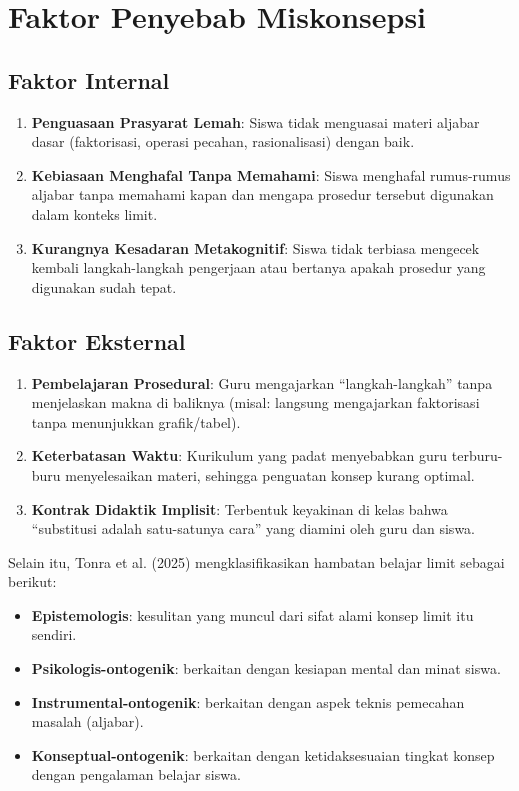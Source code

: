 \documentclass[12pt,a4paper,openany]{book}
\theoremstyle{definition}
\begin{document}
\chapter{Faktor Penyebab Miskonsepsi}

\section{Faktor Internal}

\begin{enumerate}
  \item \textbf{Penguasaan Prasyarat Lemah}: Siswa tidak menguasai materi aljabar dasar (faktorisasi, operasi pecahan, rasionalisasi) dengan baik.
  \item \textbf{Kebiasaan Menghafal Tanpa Memahami}: Siswa menghafal rumus-rumus aljabar tanpa memahami kapan dan mengapa prosedur tersebut digunakan dalam konteks limit.
  \item \textbf{Kurangnya Kesadaran Metakognitif}: Siswa tidak terbiasa mengecek kembali langkah-langkah pengerjaan atau bertanya apakah prosedur yang digunakan sudah tepat.
\end{enumerate}

\section{Faktor Eksternal}

\begin{enumerate}
  \item \textbf{Pembelajaran Prosedural}: Guru mengajarkan ``langkah-langkah'' tanpa menjelaskan makna di baliknya (misal: langsung mengajarkan faktorisasi tanpa menunjukkan grafik/tabel).
  \item \textbf{Keterbatasan Waktu}: Kurikulum yang padat menyebabkan guru terburu-buru menyelesaikan materi, sehingga penguatan konsep kurang optimal.
  \item \textbf{Kontrak Didaktik Implisit}: Terbentuk keyakinan di kelas bahwa ``substitusi adalah satu-satunya cara'' yang diamini oleh guru dan siswa.
\end{enumerate}

Selain itu, Tonra et al. (2025) mengklasifikasikan hambatan belajar limit sebagai berikut:
\begin{itemize}
  \item \textbf{Epistemologis}: kesulitan yang muncul dari sifat alami konsep limit itu sendiri.
  \item \textbf{Psikologis-ontogenik}: berkaitan dengan kesiapan mental dan minat siswa.
  \item \textbf{Instrumental-ontogenik}: berkaitan dengan aspek teknis pemecahan masalah (aljabar).
  \item \textbf{Konseptual-ontogenik}: berkaitan dengan ketidaksesuaian tingkat konsep dengan pengalaman belajar siswa.
\end{itemize}
\end{document}
